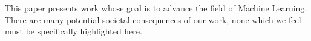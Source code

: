 \documentclass{article}
\theoremstyle{plain}
\theoremstyle{definition}
\theoremstyle{remark}
\begin{document}
This paper presents work whose goal is to advance the field of Machine
Learning. There are many potential societal consequences of our work, none
which we feel must be specifically highlighted here.




\newpage
\appendix
\onecolumn








\end{document}
